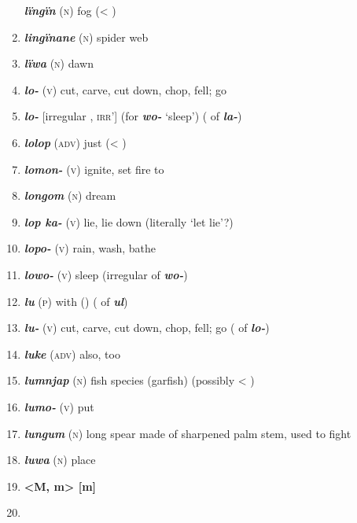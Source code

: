 \begin{enumerate}[noitemsep, label={}, align=left, widest=190, labelsep=1ex,leftmargin=*,itemindent=-10pt]
\textbf{\textit{lïngïn}} (\textsc{n}) fog (< ) \item 
\textbf{\textit{lingïnane}} (\textsc{n}) spider web \item 
\textbf{\textit{lïwa}} (\textsc{n}) dawn \item 
\textbf{\textit{lo-}} (\textsc{v}) cut, carve, cut down, chop, fell; go \item 
\textbf{\textit{lo-}} [irregular  , \textsc{irr}’] (for \textbf{\textit{wo-}} ‘sleep’) ( of \textbf{\textit{la-}}) \item 
\textbf{\textit{lolop}} (\textsc{adv)} just (< ) \item 
\textbf{\textit{lomon-}} (\textsc{v}) ignite, set fire to \item 
\textbf{\textit{longom}} (\textsc{n}) dream \item 
\textbf{\textit{lop ka-}} (\textsc{v}) lie, lie down (literally ‘let lie’?) \item 
\textbf{\textit{lopo-}} (\textsc{v}) rain, wash, bathe \item 
\textbf{\textit{lowo-}} (\textsc{v}) sleep (irregular   of \textbf{\textit{wo-}}) \item 
\textbf{\textit{lu}} (\textsc{p}) with () ( of \textbf{\textit{ul}}) \item 
\textbf{\textit{lu-}} (\textsc{v}) cut, carve, cut down, chop, fell; go (  of \textbf{\textit{lo-}}) \item 
\textbf{\textit{luke}} (\textsc{adv}) also, too \item 
\textbf{\textit{lumnjap}} (\textsc{n}) fish species (garfish) (possibly < ) \item 
\textbf{\textit{lumo-}} (\textsc{v}) put \item 
\textbf{\textit{lungum}} (\textsc{n}) long spear made of sharpened palm stem, used to fight \item 
\textbf{\textit{luwa}} (\textsc{n}) place\\ \item 

\noindent \textbf{<M, m>      [m]}\\ \item 


\end{enumerate}
